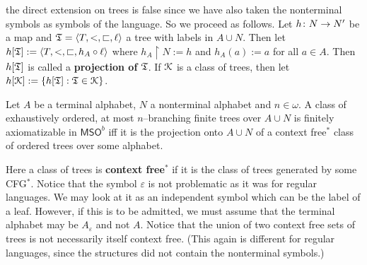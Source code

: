the direct extension on trees is false since we have
also taken the nonterminal symbols as symbols of the
language. So we proceed as follows. Let $h \colon N \rightarrow N'$ be
a map and $\mathfrak{T} = \langle T, <, \sqsubset, \ell\rangle$ a tree with
labels in $A \cup N$. Then let $h[\mathfrak{T}] :=
\langle T, <, \sqsubset, h_A \circ \ell\rangle$ where
$h_A \restriction N := h$ and $h_A(a) := a$ for all $a \in A$.
Then $h[\mathfrak{T}]$ is called a \textbf{projection of} $\mathfrak{T}$.
If $\mathcal{K}$ is a class of trees, then let $h[\mathcal{K}] :=
\{h[\mathfrak{T}] : \mathfrak{T} \in \mathcal{K}\}$. 
\begin{thm}
Let $A$ be a terminal alphabet, $N$ a nonterminal alphabet 
and $n \in \omega$. A class of exhaustively ordered, at most
$n$--branching finite trees over $A \cup N$ is finitely
axiomatizable in $\mathsf{MSO}^b$ iff it is the
projection onto $A \cup N$ of a context free$^{\ast}$ class of
ordered trees over some alphabet.
\end{thm}
Here a class of trees is \textbf{context free}$^{\ast}$ if it
is the class of trees generated by some CFG$^{\ast}$.
Notice that the symbol $\varepsilon$ is not problematic as it
was for regular languages. We may look at it as an
independent symbol which can be the label of a leaf. However,
if this is to be admitted, we must assume that the terminal
alphabet may be $A_{\varepsilon}$ and not $A$. Notice that
the union of two context free sets of trees is not necessarily
itself context free. (This again is different for regular
languages, since the structures did not contain the nonterminal
symbols.)

